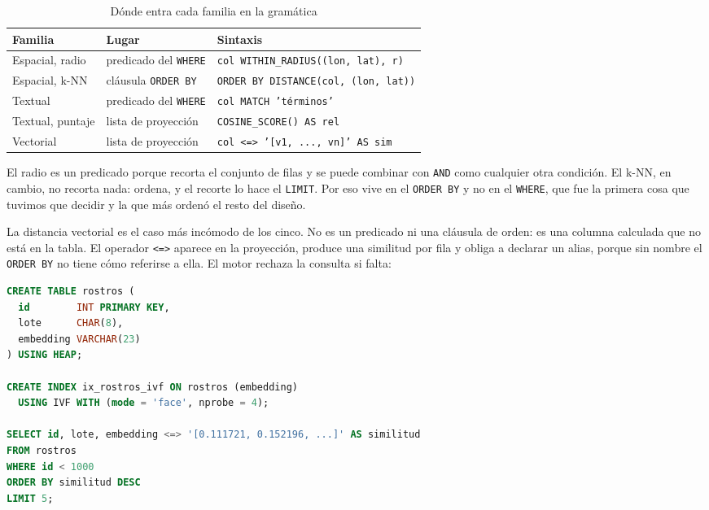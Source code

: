 \documentclass[a4paper,12pt]{article}
\begin{document}
\begin{table}[H]
\centering
\caption{Dónde entra cada familia en la gramática}
\begin{tabularx}{\textwidth}{@{}llX@{}}
\toprule
\textbf{Familia} & \textbf{Lugar} & \textbf{Sintaxis} \\
\midrule
Espacial, radio & predicado del \texttt{WHERE} & \texttt{col WITHIN\_RADIUS((lon, lat), r)} \\
Espacial, k-NN & cláusula \texttt{ORDER BY} & \texttt{ORDER BY DISTANCE(col, (lon, lat))} \\
Textual & predicado del \texttt{WHERE} & \texttt{col MATCH 'términos'} \\
Textual, puntaje & lista de proyección & \texttt{COSINE\_SCORE() AS rel} \\
Vectorial & lista de proyección & \texttt{col \textless=\textgreater{} '[v1, ..., vn]' AS sim} \\
\bottomrule
\end{tabularx}
\end{table}

El radio es un predicado porque recorta el conjunto de filas y se puede combinar
con \texttt{AND} como cualquier otra condición. El k-NN, en cambio, no recorta
nada: ordena, y el recorte lo hace el \texttt{LIMIT}. Por eso vive en el
\texttt{ORDER BY} y no en el \texttt{WHERE}, que fue la primera cosa que tuvimos
que decidir y la que más ordenó el resto del diseño.

La distancia vectorial es el caso más incómodo de los cinco. No es un predicado
ni una cláusula de orden: es una columna calculada que no está en la tabla. El
operador \texttt{\textless=\textgreater{}} aparece en la proyección, produce una similitud por fila y
obliga a declarar un alias, porque sin nombre el \texttt{ORDER BY} no tiene cómo
referirse a ella. El motor rechaza la consulta si falta:

\begin{lstlisting}[language=SQL, caption={Declaración y uso del índice vectorial}]
CREATE TABLE rostros (
  id        INT PRIMARY KEY,
  lote      CHAR(8),
  embedding VARCHAR(23)
) USING HEAP;

CREATE INDEX ix_rostros_ivf ON rostros (embedding)
  USING IVF WITH (mode = 'face', nprobe = 4);

SELECT id, lote, embedding <=> '[0.111721, 0.152196, ...]' AS similitud
FROM rostros
WHERE id < 1000
ORDER BY similitud DESC
LIMIT 5;
\end{lstlisting}
\end{document}
